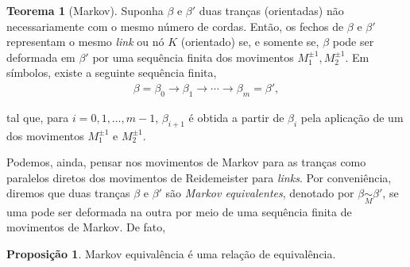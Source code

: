 \documentclass[a4paper,portuguese,11pt,twoside, leqno]{book}
\theoremstyle{definition}
\newtheorem{theorem}{Teorema}[section]
\newtheorem{prop}{Proposição}[section]
\begin{document}
	\begin{theorem}[Markov]
		\label{teorema de Markov}
		Suponha $\beta$ e $\beta'$ duas tranças (orientadas) não necessariamente com o mesmo número de cordas. Então, os fechos de $\beta$ e $\beta'$ representam o mesmo \textit{link} ou nó $K$ (orientado) se, e somente se, $\beta$ pode ser deformada em $\beta'$ por uma sequência finita dos movimentos $M_1^{\pm1}, M_2^{\pm1}$. Em símbolos, existe a seguinte sequência finita,
		\begin{align*}
		\beta = \beta_0\to\beta_1\to\cdots\to\beta_m = \beta',
		\end{align*}
		\par\vspace{0.3cm} tal que, para $i = 0,1,\dots,m-1$, $\beta_{i+1}$ é obtida a partir de $\beta_i$ pela aplicação de um dos movimentos $M_1^{\pm1}$ e $M_2^{\pm1}$.
	\end{theorem}
	\par\vspace{0.3cm} Podemos, ainda, pensar nos movimentos de Markov para as tranças como paralelos diretos dos movimentos de Reidemeister para \textit{links}. Por conveniência, diremos que duas tranças $\beta$ e $\beta'$ são \textit{Markov equivalentes}, denotado por $\beta\underset{M}{\sim}\beta'$, se uma pode ser deformada na outra por meio de uma sequência finita de movimentos de Markov. De fato,
	\begin{prop}
		\label{Markov equivalencia}
		Markov equivalência é uma relação de equivalência.
	\end{prop}  
\end{document}
